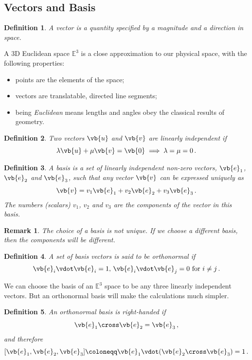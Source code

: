 \documentclass{article}
\theoremstyle{plain}\theoremheaderfont{\normalfont\itshape}\theorembodyfont{\rmfamily}\theoremseparator{.}\newtheorem*{rem}{Remark}\newtheorem*{ex}{Example}\newtheorem*{proof}{Proof}\newtheorem*{altp}{Alternative proof}
\theoremstyle{plain}\theoremheaderfont{\normalfont\bfseries}\theorembodyfont{\rmfamily}\theoremseparator{.}\newtheorem{thm}{Theorem}[section]\newtheorem{lem}[thm]{Lemma}\newtheorem{prop}[thm]{Proposition}\newtheorem*{cor}{Corollary}\newtheorem{defn}[thm]{Definition}\newtheorem{clm}[thm]{Claim}\newtheorem{clminproof}{Claim}
\theoremstyle{break}\theoremheaderfont{\normalfont\itshape}\theorembodyfont{\rmfamily}\theoremseparator{.\medskip}\newtheorem*{proofskip}{Proof}\newtheorem*{exs}{Examples}\newtheorem*{rems}{Remarks}
\theoremstyle{break}\theoremheaderfont{\normalfont\bfseries}\theorembodyfont{\rmfamily}\theoremseparator{.\medskip}\newtheorem{lemskip}[thm]{Lemma}\newtheorem{defnskip}[thm]{Definition}\newtheorem{propskip}[thm]{Proposition}\newtheorem{thmskip}[thm]{Theorem}
\numberwithin{equation}{section}
\begin{document}
	\subsection{Vectors and Basis}
	\begin{defn}
		A \textit{vector} is a quantity specified by a magnitude and a direction in space.
	\end{defn}
	A 3D Euclidean space \(\mathbb{E}^3\) is a close approximation to our physical space, with the following properties:
	\begin{itemize}[topsep=0pt]
		\item points are the elements of the space;
		\item vectors are translatable, directed line segments;
		\item being \textit{Euclidean} means lengths and angles obey the classical results of geometry.
	\end{itemize}
	\begin{defn}
		Two vectors \(\vb{u}\) and \(\vb{v}\) are \textit{linearly independent} if
		\[\lambda\vb{u}+\mu\vb{v}=\vb{0}\implies\lambda=\mu=0\,.\]
	\end{defn}
	\begin{defn}
		A \textit{basis} is a set of linearly independent non-zero vectors, \(\vb{e}_1\), \(\vb{e}_2\) and \(\vb{e}_3\), such that any vector \(\vb{v}\) can be expressed uniquely as
		\[\vb{v}=v_1\vb{e}_1+v_2\vb{e}_2+v_3\vb{e}_3\,.\]
		The numbers (scalars) \(v_1\), \(v_2\) and \(v_3\) are the \textit{components} of the vector in this basis.
	\end{defn}

	\begin{rem}
		The choice of a basis is not unique. If we choose a different basis, then the components will be different.
	\end{rem}
	
	\begin{defn}
		A set of basis vectors is said to be \textit{orthonormal} if 
		\[\vb{e}_i\vdot\vb{e}_i=1,\, \vb{e}_i\vdot\vb{e}_j=0 \text{ for } i\ne j\,.\]
	\end{defn}
	We can choose the basis of an \(\mathbb{E}^3\) space to be any three linearly independent vectors. But an orthonormal basis will make the calculations much simpler.
	\begin{defn}
		An orthonormal basis is \textit{right-handed} if
		\[\vb{e}_1\cross\vb{e}_2=\vb{e}_3\,,\]
		and therefore
		\[[\vb{e}_1,\vb{e}_2,\vb{e}_3]\coloneqq\vb{e}_1\vdot(\vb{e}_2\cross\vb{e}_3)=1\,.\]
	\end{defn}
	
\end{document}
